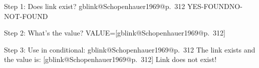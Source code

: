 \documentclass{article}
\makeatletter
\newcommand{\getgblink}[2]{\csname gblink@#1@#2\endcsname}
\newcommand{\ifgblink}[2]{%
  \ifcsname gblink@#1@#2\endcsname
    \expandafter\@firstoftwo
  \else
    \expandafter\@secondoftwo
  \fi
}
\makeatother
\begin{document}
Step 1: Does link exist? 
\ifgblink{Schopenhauer1969}{p.~312}{YES-FOUND}{NO-NOT-FOUND}

Step 2: What's the value? 
VALUE=[\getgblink{Schopenhauer1969}{p.~312}]

Step 3: Use in conditional:
\ifgblink{Schopenhauer1969}{p.~312}{
  The link exists and the value is: [\getgblink{Schopenhauer1969}{p.~312}]
}{
  Link does not exist!
}
\end{document}
